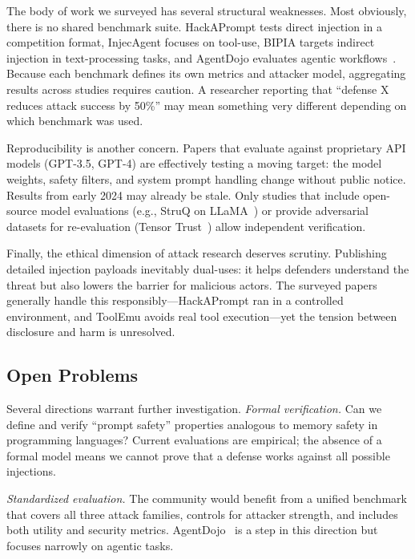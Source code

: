 The body of work we surveyed has several structural weaknesses. Most obviously, there is no shared benchmark suite. HackAPrompt tests direct injection in a competition format, InjecAgent focuses on tool-use, BIPIA targets indirect injection in text-processing tasks, and AgentDojo evaluates agentic workflows~\cite{perez2022hackaprompt, zhan2024injecagent, yi2023bipia, debenedetti2024agentdojo}. Because each benchmark defines its own metrics and attacker model, aggregating results across studies requires caution. A researcher reporting that ``defense X reduces attack success by 50\%'' may mean something very different depending on which benchmark was used.

Reproducibility is another concern. Papers that evaluate against proprietary API models (GPT-3.5, GPT-4) are effectively testing a moving target: the model weights, safety filters, and system prompt handling change without public notice. Results from early 2024 may already be stale. Only studies that include open-source model evaluations (e.g., StruQ on LLaMA~\cite{chen2024struq}) or provide adversarial datasets for re-evaluation (Tensor Trust~\cite{toyer2024tensor}) allow independent verification.

Finally, the ethical dimension of attack research deserves scrutiny. Publishing detailed injection payloads inevitably dual-uses: it helps defenders understand the threat but also lowers the barrier for malicious actors. The surveyed papers generally handle this responsibly---HackAPrompt ran in a controlled environment, and ToolEmu avoids real tool execution---yet the tension between disclosure and harm is unresolved.

\subsection{Open Problems}

Several directions warrant further investigation. \emph{Formal verification.} Can we define and verify ``prompt safety'' properties analogous to memory safety in programming languages? Current evaluations are empirical; the absence of a formal model means we cannot prove that a defense works against all possible injections.

\emph{Standardized evaluation.} The community would benefit from a unified benchmark that covers all three attack families, controls for attacker strength, and includes both utility and security metrics. AgentDojo~\cite{debenedetti2024agentdojo} is a step in this direction but focuses narrowly on agentic tasks.

